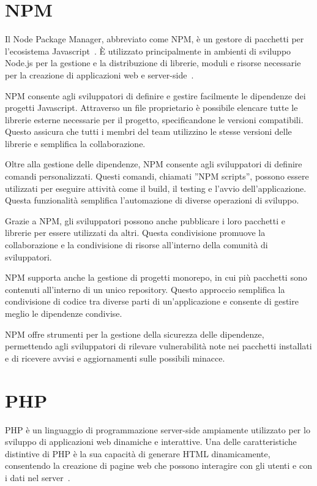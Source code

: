 \section{NPM}
Il Node Package Manager, abbreviato come NPM, è un gestore di pacchetti per l'ecosistema Javascript~\cite{NPM}. È utilizzato principalmente in ambienti di sviluppo Node.js per la gestione e la distribuzione di librerie, moduli e risorse necessarie per la creazione di applicazioni web e server-side~\cite{Nodejs}.

NPM consente agli sviluppatori di definire e gestire facilmente le dipendenze dei progetti Javascript. Attraverso un file proprietario è possibile elencare tutte le librerie esterne necessarie per il progetto, specificandone le versioni compatibili. Questo assicura che tutti i membri del team utilizzino le stesse versioni delle librerie e semplifica la collaborazione.

Oltre alla gestione delle dipendenze, NPM consente agli sviluppatori di definire comandi personalizzati. Questi comandi, chiamati ”NPM scripts”, possono essere utilizzati per eseguire attività come il build, il testing e l'avvio dell'applicazione. Questa funzionalità semplifica l'automazione di diverse operazioni di sviluppo.

Grazie a NPM, gli sviluppatori possono anche pubblicare i loro pacchetti e librerie per essere utilizzati da altri. Questa condivisione promuove la collaborazione e la condivisione di risorse all'interno della comunità di sviluppatori.

NPM supporta anche la gestione di progetti monorepo, in cui più pacchetti sono contenuti all'interno di un unico repository. Questo approccio semplifica la condivisione di codice tra diverse parti di un'applicazione e consente di gestire meglio le dipendenze condivise.

NPM offre strumenti per la gestione della sicurezza delle dipendenze, permettendo agli sviluppatori di rilevare vulnerabilità note nei pacchetti installati e di ricevere avvisi e aggiornamenti sulle possibili minacce.

\section{PHP}
PHP è un linguaggio di programmazione server-side ampiamente utilizzato per lo sviluppo di applicazioni web dinamiche e interattive. Una delle caratteristiche distintive di PHP è la sua capacità di generare HTML dinamicamente, consentendo la creazione di pagine web che possono interagire con gli utenti e con i dati nel server~\cite{ALL_WEB, PHP}.

